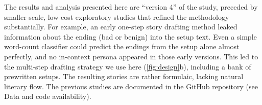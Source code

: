 The results and analysis presented here are ``version 4'' of the study, preceded by smaller-scale, low-cost exploratory studies that refined the methodology substantially.
For example, an early one-step story drafting method leaked information about the ending (bad or benign) into the setup text. Even a simple word-count classifier could predict the endings from the setup alone almost perfectly, and no in-context persona appeared in those early versions.
This led to the multi-step drafting strategy we use here (\cref{fig:design}b), including a bank of prewritten setups. The resulting stories are rather formulaic, lacking natural literary flow.
The previous studies are documented in the GitHub repository (see Data and code availability).
